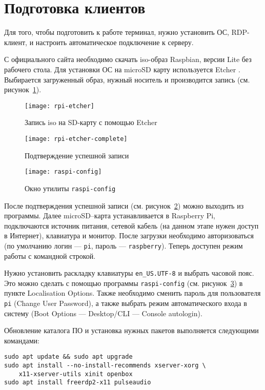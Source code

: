 \clearpage
\section{Подготовка клиентов}

Для того, чтобы подготовить к работе терминал, нужно установить ОС, RDP-клиент, и 
настроить автоматическое подключение к серверу.

С официального сайта \cite{ref:raspbian} необходимо скачать iso-образ Raspbian, версии
Lite без рабочего стола. Для установки ОС на microSD карту используется Etcher
\cite{ref:etcher}. Выбирается загруженный образ, нужный носитель и производится запись
(см. рисунок~\ref{pic:rpi-etcher}).

\begin{figure}[h]
    \center
    \texttt{[image: rpi-etcher]}
    \caption{Запись iso на SD-карту с помощью Etcher}
    \label{pic:rpi-etcher}
\end{figure}

\begin{figure}[h]
    \center
    \texttt{[image: rpi-etcher-complete]}
    \caption{Подтверждение успешной записи}
    \label{pic:rpi-etcher-complete}
\end{figure}

\begin{figure}[h]
    \center
    \texttt{[image: raspi-config]}
    \caption{Окно утилиты \texttt{raspi-config}}
    \label{pic:raspi-config}
\end{figure}

После подтверждения успешной записи (см. рисунок~\ref{pic:rpi-etcher-complete}) можно
выходить из программы. Далее microSD–карта устанавливается в Raspberry Pi, подключаются
источник питания, сетевой кабель (на данном этапе нужен доступ в Интернет), клавиатура 
и монитор. После загрузки необходимо авторизоваться (по умолчанию логин — 
\texttt{pi}, пароль — \texttt{raspberry}). Теперь доступен режим работы с командной
строкой.

Нужно установить раскладку клавиатуры \texttt{en\_US.UTF-8} и выбрать часовой пояс. Это
можно сделать с помощью программы \texttt{raspi-config} (см.
рисунок~\ref{pic:raspi-config}) в пункте Localisation Options.  Также необходимо сменить
пароль для пользователя \texttt{pi} (Change User Password), а также выбрать режим
автоматического входа в систему (Boot Options — Desktop/CLI — Console autologin).

Обновление каталога ПО и установка нужных пакетов выполняется следующими командами:
\begin{verbatim}
sudo apt update && sudo apt upgrade
sudo apt install --no-install-recommends xserver-xorg \
    x11-xserver-utils xinit openbox
sudo apt install freerdp2-x11 pulseaudio
\end{verbatim}

